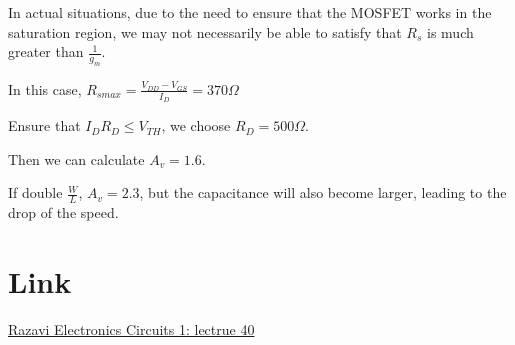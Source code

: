 \documentclass[fontset=windows]{article}
\begin{document}
In actual situations, due to the need to ensure that the MOSFET works in the saturation region, we may not necessarily be able to satisfy that $R_s$ is much greater than $\frac{1}{g_m}$. 

In this case, $R_{smax}=\frac{V_{DD}-V_{GS}}{I_D}=370\Omega$

Ensure that $I_DR_D\leq V_{TH}$, we choose $R_D=500\Omega$. 

Then we can calculate $A_v=1.6$. 

If double $\frac{W}{L}$, $A_v=2.3$, but the capacitance will also become larger, leading to the drop of the speed. 

\section*{Link}

\href{https://www.bilibili.com/video/BV1FD4y1R7Ah?p=40&vd_source=1d0c07486a3bd3b0adb8ac548bf6453e}{Razavi Electronics Circuits 1: lectrue 40}
\end{document}
